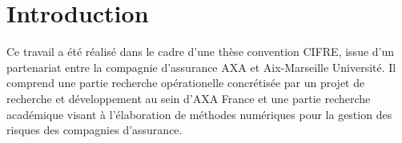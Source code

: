 \chapter*{Introduction}
 




Ce travail a été réalisé dans le cadre d\rq{}une thèse convention CIFRE, issue d\rq{}un partenariat entre la compagnie d\rq{}assurance AXA et Aix-Marseille Université. Il comprend une partie recherche opérationelle concrétisée par un projet de recherche et développement au sein d\rq{}AXA France et une partie recherche académique visant à l\rq{}élaboration de méthodes numériques pour la gestion des risques des compagnies d\rq{}assurance. \\

